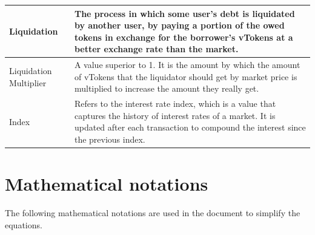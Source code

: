 \begin{tabularx}{\linewidth}{|l|X|}
  Liquidation & The process in which some user's debt is liquidated by another user, by paying a portion of the owed tokens in exchange for the borrower's vTokens at a better exchange rate than the market. \\\hline

  Liquidation Multiplier & A value superior to 1. It is the amount by which the amount of vTokens that the liquidator should get by market price is multiplied to increase the amount they really get. \\\hline

  Index & Refers to the interest rate index, which is a value that captures the history of interest rates of a market. It is updated after each transaction to compound the interest since the previous index. \\\hline
\end{tabularx}

\newpage
\section{Mathematical notations}
\label{spec:mn}
The following mathematical notations are used in the document to simplify the equations.

\newcommand\USD{\mathit{USD}}

\newcommand\M[1]{\mathit{m_{#1}}}
\newcommand\T[1]{\mathit{T(#1)}}
\newcommand\vT[1]{\mathit{vT(#1)}}

\newcommand\ER[2]{\mathit{ER(#1, #2)}}

\newcommand\BA[1]{\mathit{Ba(#1)}}
\newcommand\C[1]{\mathit{C(#1)}}

\newcommand\UR[1]{\mathit{UR(#1)}}
\newcommand\UMul[1]{\mathit{UM(#1)}}
\newcommand\UBR[1]{\mathit{UbR(#1)}}
\newcommand\BIR[1]{\mathit{BIR(#1)}}
\newcommand\RF[1]{\mathit{RF_{#1}}}

\newcommand\RTB[1]{\mathit{rTB(#1)}}
\newcommand\VTB[1]{\mathit{vTB_{#1}}}
\newcommand\RES[1]{\mathit{Res_{#1}}}

\newcommand\CF[1]{\mathit{CF(#1)}}
\newcommand\LMul[1]{\mathit{LMul(#1)}}
\newcommand\AH[1]{\mathit{AH_{#1}}}
\newcommand\BC[1]{\mathit{BC_{#1}}}
\newcommand\SI[1]{\mathit{SI_{#1}}}
\newcommand\BI[1]{\mathit{BI_{#1}}}
\newcommand\uvTA[2]{\mathit{uvTA_{#1, #2}}}


\newcommand\IND[2]{\mathit{Ind_{#1, #2}}}
\newcommand\INDL[1]{\mathit{Indl_{#1}}}
\newcommand\AI[1]{\mathit{AI_{#1}}}
\newcommand\SIF[1]{\mathit{SIF_{#1}}}

